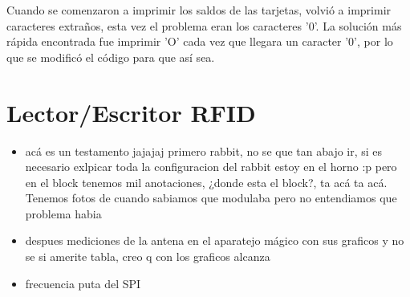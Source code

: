 Cuando se comenzaron a imprimir los saldos de las tarjetas, volvió a imprimir caracteres extraños, esta vez el problema eran los caracteres '0'. La solución más rápida encontrada fue imprimir 'O' cada vez que llegara un caracter '0', por lo que se modificó el código para que así sea.


\section{Lector/Escritor RFID}
\begin{itemize}
\item acá es un testamento jajajaj primero rabbit, no se que tan abajo ir, si es necesario exlpicar toda la configuracion del rabbit estoy en el horno :p pero en el block tenemos mil anotaciones, ¿donde esta el block?, ta acá ta acá. Tenemos fotos de cuando sabiamos que modulaba pero no entendiamos que problema habia
\item despues mediciones de la antena en el aparatejo mágico con sus graficos y no se si amerite tabla, creo q con los graficos alcanza
\item frecuencia puta del SPI
\end{itemize}


